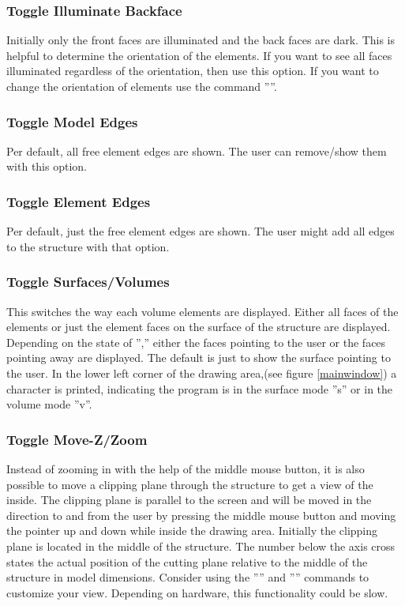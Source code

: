 \documentclass{article}
\begin{document}
\subsubsection{\label{Toggle Illuminate Backface}Toggle Illuminate Backface}
Initially only the front faces are illuminated and the back faces are dark. This is helpful to determine the orientation of the elements. If you want to see all faces illuminated regardless of the orientation, then use this option. If you want to change the orientation of elements use the command ''''.

\subsubsection{\label{Toggle Model Edges}Toggle Model Edges}
Per default, all free element edges are shown. The user can remove/show them with this option.

\subsubsection{\label{Toggle Element Edges}Toggle Element Edges}
Per default, just the free element edges are shown. The user might add all edges to the structure with that option.

\subsubsection{\label{Toggle Surfaces/Volumes}Toggle Surfaces/Volumes}
This switches the way each volume elements are displayed. Either all faces of the elements or just the element faces on the surface of the structure are displayed. Depending on the state of '','' either the faces pointing to the user or the faces pointing away are displayed. The default is just to show the surface pointing to the user. In the lower left corner of the drawing area,(see figure \ref{mainwindow}) a character is printed, indicating the program is in the surface mode ''s'' or in the volume mode ''v''.

\subsubsection{\label{Toggle Move-Z/Zoom}Toggle Move-Z/Zoom}
Instead of zooming in with the help of the middle mouse button, it is also possible to move a clipping plane through the structure to get a view of the inside. The clipping plane is parallel to the screen and will be moved in the direction to and from the user by pressing the middle mouse button and moving the pointer up and down while inside the drawing area. Initially the clipping plane is located in the middle of the structure. The number below the axis cross states the actual position of the cutting plane relative to the middle of the structure in model dimensions. Consider using the '''' and '''' commands to customize your view. Depending on hardware, this functionality could be slow. 
\end{document}
